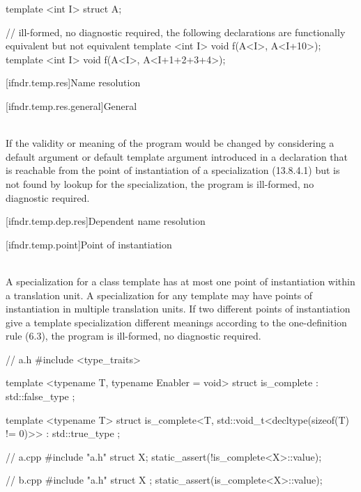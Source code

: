 \pnum
\begin{example}
\begin{codeblock}
template <int I>
struct A{};

// ill-formed, no diagnostic required, the following declarations are functionally equivalent but not equivalent
template <int I> void f(A<I>, A<I+10>);
template <int I> void f(A<I>, A<I+1+2+3+4>);
\end{codeblock}
\end{example}

[ifndr.temp.res]{Name resolution}

[ifndr.temp.res.general]{General}

\pnum
{} \\
If the validity or meaning of the program would be changed by considering a default argument or default
template argument introduced in a declaration that is reachable from the point of instantiation of a
specialization (13.8.4.1) but is not found by lookup for the specialization, the program is ill-formed, no
diagnostic required.

\pnum
\begin{example}
\begin{codeblock}
\end{codeblock}
\end{example}

[ifndr.temp.dep.res]{Dependent name resolution}

[ifndr.temp.point]{Point of instantiation}

\pnum
{} \\
A specialization for a class template has at most one point of instantiation within a translation unit. A
specialization for any template may have points of instantiation in multiple translation units. If two different
points of instantiation give a template specialization different meanings according to the one-definition
rule (6.3), the program is ill-formed, no diagnostic required.

\pnum
\begin{example}
\begin{codeblock}
// a.h
#include <type_traits>

template <typename T, typename Enabler = void>
struct is_complete : std::false_type {};

template <typename T>
struct is_complete<T, std::void_t<decltype(sizeof(T) != 0)>> : std::true_type {};

// a.cpp
#include "a.h"
struct X;
static_assert(!is_complete<X>::value);

// b.cpp
#include "a.h"
struct X { };
static_assert(is_complete<X>::value);
\end{codeblock}
\end{example}


